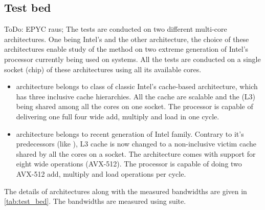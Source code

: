 \subsection{Test bed}
{\GW ToDo: EPYC raus;}
The tests are conducted on two different multi-core architectures. One being Intel's \IVB and the other \SKX architecture, the choice of these architectures enable study of the method on two extreme generation of Intel's processor currently being used on \HPC systems. All the tests are conducted on a single socket (chip) of these architectures using all its available cores. 

\begin{itemize}
	\item \Intel \IVB architecture belongs to class of classic Intel's cache-based architecture, which has three inclusive cache  hierarchies. All the cache are scalable and the \LLC (L3) being shared among all the cores on one socket. The processor is capable of delivering one full four wide \SIMD add, multiply and load in one cycle. 
	\item \Intel \SKX architecture belongs to recent generation of Intel family. Contrary to it's predecessors (like \IVB), L3 cache is now changed to a non-inclusive victim cache shared by all the cores on a socket. The architecture comes with support for eight wide \SIMD operations (AVX-512). The processor is capable of doing two AVX-512 add, multiply and load operations per cycle.
	\begin{comment}
	\item {\GW \AMD \EPY is based on AMD's Zen microarchitecture. The basic building block of the architecture consists of Core Complex (CCX) consisting of three cores (can extend upto four on high end models) each having it's own private L1 and L2 cache. The L3 cache is shared between a core complex and is non-inclusive victim cache. A single socket of \EPY consists of eight such CCX.}
	\end{comment}
	
\end{itemize}
The details of architectures along with the measured bandwidths are given in \cref{tab:test_bed}. The bandwidths are measured using \likwidBench suite.

